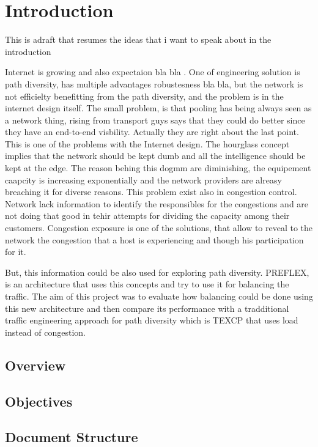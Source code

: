 \chapter{Introduction}
\label{chapter:intro}
This is adraft that resumes the ideas that i want to speak about in the introduction

Internet is growing and also expectaion bla bla . One of  engineering solution is path diversity, has multiple advantages robustesness bla bla, but the network is not efficielty benefitting from the path diversity, and the problem is in the internet design itself. The small problem, is that pooling has being always seen as a network thing, rising from transport guys says that they could do better since they have an end-to-end visbility. Actually they are right about the last point. This is one of the problems with the Internet design. The hourglass concept implies that the network should be kept dumb and all the intelligence should be kept at the edge. The reason behing this dogmm are diminishing, the equipement caapcity is increasing exponentially and the network providers are alreasy breaching it for diverse reasons. This problem exist also in congestion control. Network lack  information to identify the responsibles for the congestions and are not doing that good in tehir attempts for dividing the capacity among their customers. Congestion exposure is one of the solutions, that allow to reveal to the network the congestion that a host is experiencing and though his participation for it.

But, this information could be also used for exploring path diversity. PREFLEX, is an architecture that uses this concepts and try to use it for balancing the traffic. The aim of this project was to evaluate how balancing could be done using this new architecture and then compare its performance with a tradditional traffic engineering approach for path diversity which is TEXCP that uses load instead of congestion.

\label{intro}
\section{Overview}     %
\section{Objectives}
\section{Document Structure}

